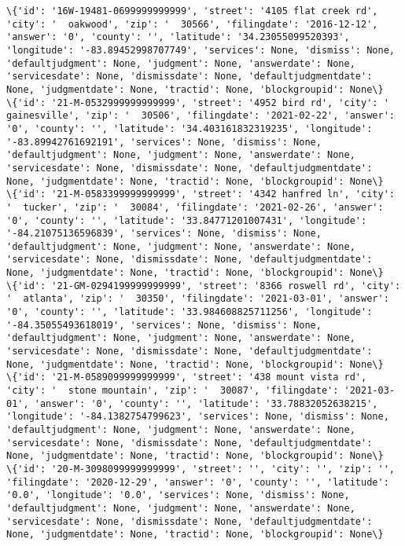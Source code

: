 \documentclass[11pt]{article}
\begin{document}
\begin{Verbatim}[commandchars=\\\{\}]
\{'id': '16W-19481-0699999999999', 'street': '4105 flat creek rd', 'city': '  oakwood', 'zip': '  30566', 'filingdate': '2016-12-12', 'answer': '0', 'county': '', 'latitude': '34.23055099520393', 'longitude': '-83.89452998707749', 'services': None, 'dismiss': None, 'defaultjudgment': None, 'judgment': None, 'answerdate': None, 'servicesdate': None, 'dismissdate': None, 'defaultjudgmentdate': None, 'judgmentdate': None, 'tractid': None, 'blockgroupid': None\}
\{'id': '21-M-0532999999999999', 'street': '4952 bird rd', 'city': '  gainesville', 'zip': '  30506', 'filingdate': '2021-02-22', 'answer': '0', 'county': '', 'latitude': '34.403161832319235', 'longitude': '-83.89942761692191', 'services': None, 'dismiss': None, 'defaultjudgment': None, 'judgment': None, 'answerdate': None, 'servicesdate': None, 'dismissdate': None, 'defaultjudgmentdate': None, 'judgmentdate': None, 'tractid': None, 'blockgroupid': None\}
\{'id': '21-M-0583399999999999', 'street': '4342 hanfred ln', 'city': '  tucker', 'zip': '  30084', 'filingdate': '2021-02-26', 'answer': '0', 'county': '', 'latitude': '33.84771201007431', 'longitude': '-84.21075136596839', 'services': None, 'dismiss': None, 'defaultjudgment': None, 'judgment': None, 'answerdate': None, 'servicesdate': None, 'dismissdate': None, 'defaultjudgmentdate': None, 'judgmentdate': None, 'tractid': None, 'blockgroupid': None\}
\{'id': '21-GM-0294199999999999', 'street': '8366 roswell rd', 'city': '  atlanta', 'zip': '  30350', 'filingdate': '2021-03-01', 'answer': '0', 'county': '', 'latitude': '33.984608825711256', 'longitude': '-84.35055493618019', 'services': None, 'dismiss': None, 'defaultjudgment': None, 'judgment': None, 'answerdate': None, 'servicesdate': None, 'dismissdate': None, 'defaultjudgmentdate': None, 'judgmentdate': None, 'tractid': None, 'blockgroupid': None\}
\{'id': '21-M-0589099999999999', 'street': '438 mount vista rd', 'city': '  stone mountain', 'zip': '  30087', 'filingdate': '2021-03-01', 'answer': '0', 'county': '', 'latitude': '33.78832052638215', 'longitude': '-84.1382754799623', 'services': None, 'dismiss': None, 'defaultjudgment': None, 'judgment': None, 'answerdate': None, 'servicesdate': None, 'dismissdate': None, 'defaultjudgmentdate': None, 'judgmentdate': None, 'tractid': None, 'blockgroupid': None\}
\{'id': '20-M-3098099999999999', 'street': '', 'city': '', 'zip': '', 'filingdate': '2020-12-29', 'answer': '0', 'county': '', 'latitude': '0.0', 'longitude': '0.0', 'services': None, 'dismiss': None, 'defaultjudgment': None, 'judgment': None, 'answerdate': None, 'servicesdate': None, 'dismissdate': None, 'defaultjudgmentdate': None, 'judgmentdate': None, 'tractid': None, 'blockgroupid': None\}

\end{Verbatim}
\end{document}
